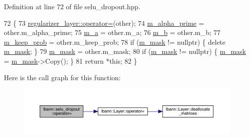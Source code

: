 Definition at line 72 of file selu\+\_\+dropout.\+hpp.


\begin{DoxyCode}
72                                                      \{
73     \hyperlink{classlbann_1_1Layer_a00d8acde68fda2f38c4a39ef8c89234a}{regularizer\_layer::operator=}(other);
74     \hyperlink{classlbann_1_1selu__dropout_a8db065b13d8737e1bd4cf154ab3fe666}{m\_alpha\_prime} = other.m\_alpha\_prime;
75     \hyperlink{classlbann_1_1selu__dropout_a52bd21583da68ba4e8a374fab259a3ef}{m\_a} = other.m\_a;
76     \hyperlink{classlbann_1_1selu__dropout_a456fa501b7df6b52701c1aa3639ebc42}{m\_b} = other.m\_b;
77     \hyperlink{classlbann_1_1selu__dropout_a00bd2a07703e2e918af8ae68b58ff11b}{m\_keep\_prob} = other.m\_keep\_prob;
78     \textcolor{keywordflow}{if} (\hyperlink{classlbann_1_1selu__dropout_a31aaadbc51d78673a84390b48d4e5950}{m\_mask} != \textcolor{keyword}{nullptr}) \{ \textcolor{keyword}{delete} \hyperlink{classlbann_1_1selu__dropout_a31aaadbc51d78673a84390b48d4e5950}{m\_mask}; \}
79     \hyperlink{classlbann_1_1selu__dropout_a31aaadbc51d78673a84390b48d4e5950}{m\_mask} = other.m\_mask;
80     \textcolor{keywordflow}{if} (\hyperlink{classlbann_1_1selu__dropout_a31aaadbc51d78673a84390b48d4e5950}{m\_mask} != \textcolor{keyword}{nullptr}) \{ \hyperlink{classlbann_1_1selu__dropout_a31aaadbc51d78673a84390b48d4e5950}{m\_mask} = \hyperlink{classlbann_1_1selu__dropout_a31aaadbc51d78673a84390b48d4e5950}{m\_mask}->Copy(); \}
81     \textcolor{keywordflow}{return} *\textcolor{keyword}{this};
82   \}
\end{DoxyCode}
Here is the call graph for this function\+:\nopagebreak
\begin{figure}[H]
\begin{center}
\leavevmode
\includegraphics[width=350pt]{classlbann_1_1selu__dropout_aa4563c71596c91bb568a6808d38e8758_cgraph}
\end{center}
\end{figure}
\mbox{\label{classlbann_1_1selu__dropout_a8b6469a14cf093d48e42384aa4ee404a}} 
